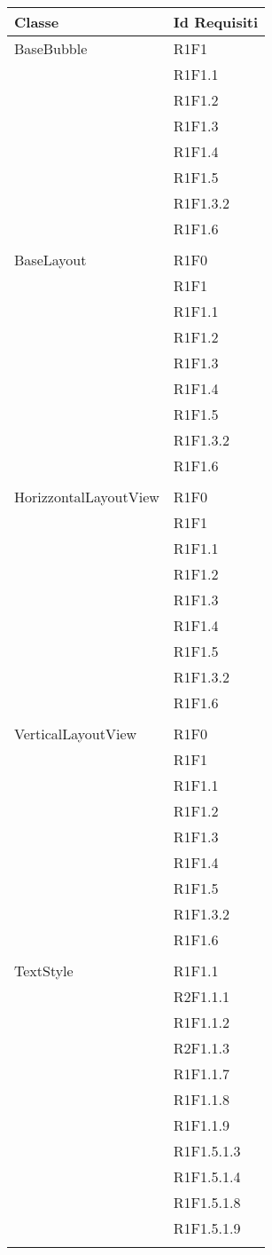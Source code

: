 \begin{center}
	\begin{longtable}{|p{7cm}|p{7cm}|}\hline
		Classe & Id Requisiti \\ \hline
		BaseBubble & R1F1 \\ & R1F1.1 \\ & R1F1.2 \\ & R1F1.3 \\ & R1F1.4 \\ & R1F1.5 \\ & R1F1.3.2 \\ & R1F1.6 \\ & \\ \hline
		BaseLayout & R1F0 \\ & R1F1 \\ & R1F1.1 \\ & R1F1.2 \\ & R1F1.3 \\ & R1F1.4 \\ & R1F1.5 \\ & R1F1.3.2 \\ & R1F1.6 \\ & \\ \hline
		HorizzontalLayoutView & R1F0 \\ & R1F1 \\ & R1F1.1 \\ & R1F1.2 \\ & R1F1.3 \\ & R1F1.4 \\ & R1F1.5 \\ & R1F1.3.2 \\ & R1F1.6 \\ & \\ \hline
		VerticalLayoutView & R1F0 \\ & R1F1 \\ & R1F1.1 \\ & R1F1.2 \\ & R1F1.3 \\ & R1F1.4 \\ & R1F1.5 \\ & R1F1.3.2 \\ & R1F1.6 \\ & \\ \hline
		TextStyle & R1F1.1 \\ & R2F1.1.1 \\ & R1F1.1.2 \\ & R2F1.1.3 \\ & R1F1.1.7 \\ & R1F1.1.8 \\ & R1F1.1.9 \\ & R1F1.5.1.3 \\ & R1F1.5.1.4 \\ & R1F1.5.1.8 \\ & R1F1.5.1.9 \\ & \\ \hline

\end{longtable}
\end{center}
